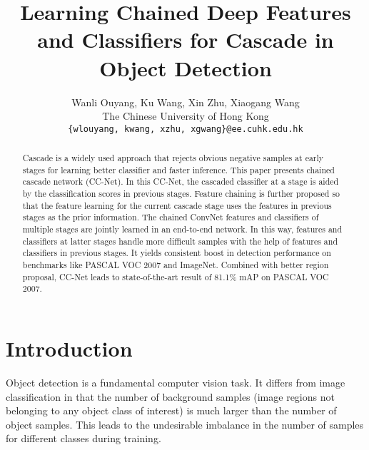 \documentclass[10pt,twocolumn,letterpaper]{article}
\begin{document}
\title{Learning Chained Deep Features and Classifiers for Cascade in Object Detection}

\author{Wanli Ouyang,  Ku Wang, Xin Zhu, Xiaogang Wang \\
The Chinese University of Hong Kong\\
{\tt\small \{wlouyang, kwang, xzhu, xgwang\}@ee.cuhk.edu.hk}
}

\maketitle

\begin{abstract}
Cascade is a widely used approach that rejects obvious negative samples at early stages for learning better classifier and faster inference.
This paper presents chained cascade network (CC-Net). In this CC-Net, the cascaded classifier at a stage is aided by the classification scores in previous stages. Feature chaining is further proposed so that the feature learning for the current cascade stage uses the features in previous stages as the prior information. The chained ConvNet features and classifiers of multiple stages are jointly learned in an end-to-end network. In this way, features and classifiers at latter stages handle more difficult samples with the help of features and classifiers in previous stages.  It yields consistent boost in detection performance on benchmarks like PASCAL VOC 2007 and ImageNet.
Combined with better region proposal, CC-Net leads to state-of-the-art result of 81.1\% mAP on PASCAL VOC 2007.
\end{abstract}

\section{Introduction}
Object detection is a fundamental computer vision task. 
It differs from image classification in that the number of background samples (image regions not belonging to any object class of interest) is much larger than the number of object samples. This leads to the undesirable imbalance in the number of samples for different classes during training.
\end{document}
